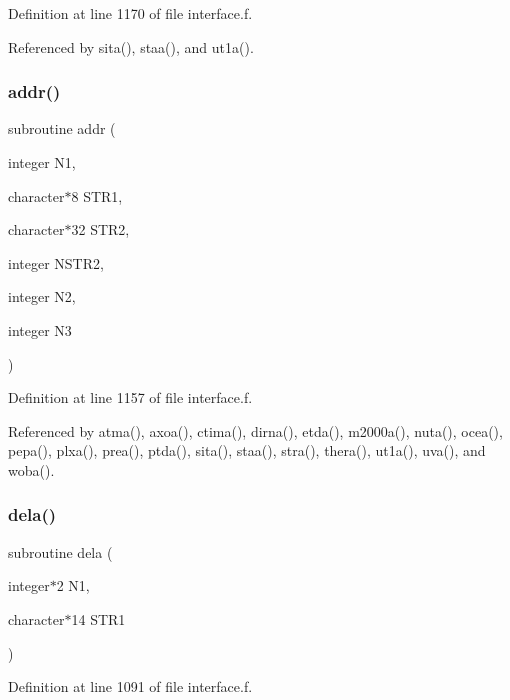 Definition at line 1170 of file interface.\+f.



Referenced by sita(), staa(), and ut1a().

\mbox{\label{interface_8f_a5696959340499139130b420c4ac78373}} 
\subsubsection{\texorpdfstring{addr()}{addr()}}
{\footnotesize\ttfamily subroutine addr (\begin{DoxyParamCaption}\item[{integer}]{N1,  }\item[{character$\ast$8}]{S\+T\+R1,  }\item[{character$\ast$32}]{S\+T\+R2,  }\item[{integer}]{N\+S\+T\+R2,  }\item[{integer}]{N2,  }\item[{integer}]{N3 }\end{DoxyParamCaption})}



Definition at line 1157 of file interface.\+f.



Referenced by atma(), axoa(), ctima(), dirna(), etda(), m2000a(), nuta(), ocea(), pepa(), plxa(), prea(), ptda(), sita(), staa(), stra(), thera(), ut1a(), uva(), and woba().

\mbox{\label{interface_8f_a1fd2e83b281606407f7990c756d9072c}} 
\subsubsection{\texorpdfstring{dela()}{dela()}}
{\footnotesize\ttfamily subroutine dela (\begin{DoxyParamCaption}\item[{integer$\ast$2}]{N1,  }\item[{character$\ast$14}]{S\+T\+R1 }\end{DoxyParamCaption})}



Definition at line 1091 of file interface.\+f.



